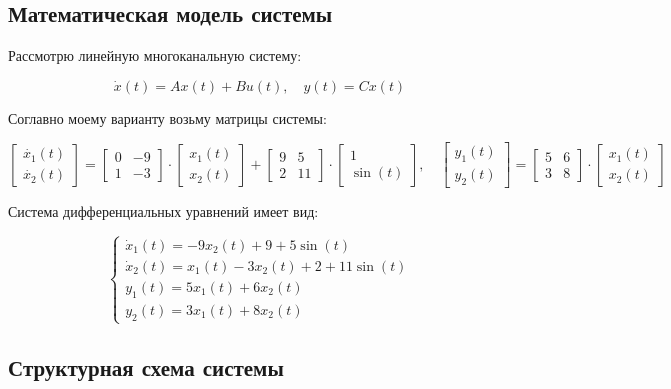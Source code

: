 \documentclass[a4paper,12pt]{article}
\begin{document}
	\subsection{Математическая модель системы}
	
	Рассмотрю линейную многоканальную систему:
	
	\[
	\dot{x}(t) = A x(t) + B u(t), \quad y(t) = C x(t)
	\]
	
	Соглавно моему варианту возьму матрицы системы:
	
	
	\[
	\begin{bmatrix}
		\dot{x_1}(t) \\ \dot{x_2}(t)
	\end{bmatrix} = 
	\begin{bmatrix}
		0 & -9 \\
		1 & -3
	\end{bmatrix}\cdot
	\begin{bmatrix} 
		x_1(t) \\ x_2(t)
	\end{bmatrix} + 
	\begin{bmatrix}
		9 & 5 \\
		2 & 11
	\end{bmatrix}\cdot
	\begin{bmatrix}
		1 \\
		\sin(t)
	\end{bmatrix}, \quad \begin{bmatrix}
	y_1(t) \\ y_2(t)
	\end{bmatrix} = \begin{bmatrix}
	5 & 6 \\
	3 & 8
	\end{bmatrix}\cdot \begin{bmatrix}
	x_1(t) \\ x_2(t)
	\end{bmatrix}
	\]
	
	Система дифференциальных уравнений имеет вид:
	
	\[
	\begin{cases}
		\dot{x}_1(t) = -9x_2(t) + 9 + 5\sin(t) \\
		\dot{x}_2(t) = x_1(t) - 3x_2(t) + 2 + 11\sin(t) \\
		y_1(t) = 5x_1(t) + 6x_2(t) \\
		y_2(t) = 3x_1(t) + 8x_2(t)
	\end{cases}
	\]
	
	\subsection{Структурная схема системы}
	
\end{document}
